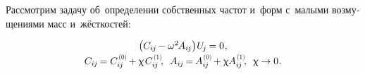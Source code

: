

\begin{otherlanguage}{russian}

Рассмотрим задачу об~определении собственных частот и~форм с~малыми возмущениями масс и~жёсткостей:

\nopagebreak\vspace{-0.1em}\begin{equation}\begin{array}{c}
\bigl( C_{i\hspace{-0.1ex}j} \hspace{-0.15ex} - \omega^2 \hspace{-0.2ex} A_{i\hspace{-0.1ex}j} \bigr) \hspace{.1ex} U_{\hspace{-0.2ex}j} \hspace{-0.15ex} = 0 \hspace{.1ex} ,
\\[.2em]
%
C_{i\hspace{-0.1ex}j} \hspace{-0.2ex} = C_{i\hspace{-0.1ex}j}^{\hspace{.2ex}\scalebox{0.66}[0.66]{(0)}} \hspace{-0.2ex} + \smallparameter \hspace{.2ex} C_{i\hspace{-0.1ex}j}^{\hspace{.2ex}\scalebox{0.66}[0.66]{(1)}} \hspace{-0.4ex} ,
\;\:
A_{i\hspace{-0.1ex}j} \hspace{-0.2ex} = \hspace{-0.2ex} A_{i\hspace{-0.1ex}j}^{\hspace{.2ex}\scalebox{0.66}[0.66]{(0)}} \hspace{-0.2ex} + \smallparameter \hspace{-0.1ex} A_{i\hspace{-0.1ex}j}^{\hspace{.2ex}\scalebox{0.66}[0.66]{(1)}} \hspace{-0.4ex} ,
\;\:
\smallparameter \hspace{-0.12ex} \to 0 \hspace{.1ex} .
\end{array}\end{equation}


\end{otherlanguage}
